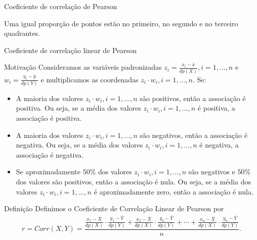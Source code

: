 \documentclass[9pt]{beamer}
\begin{document}
\begin{frame}{Coeficiente de correlação de Pearson}
\begin{center}
\begin{minipage}[b]{0.35\linewidth}
\begin{figure}[htbp]
			\end{figure}
		\end{minipage}%
		\begin{minipage}[b]{0.35\linewidth}
			\begin{center}
					Uma igual proporção de pontos estão no primeiro, no segundo e no terceiro quadrantes.
			\end{center}
		\end{minipage} 
	\end{center}
	
\normalsize
\end{frame}

\begin{frame}{Coeficiente de correlação linear de Pearson}

\small
\begin{block}{Motivação}
	Consideramos as variáveis padronizadas $z_i = \frac{x_i - \bar{x}}{dp(X)}, i=1, \dots, n$ e $w_i = \frac{y_i - \bar{y}}{dp(Y)}$ e multiplicamos as coordenadas $z_i \cdot w_i, i=1, \dots, n$. Se:
	\begin{itemize}
		\item A maioria dos valores  $z_i \cdot w_i, i=1, \dots, n$ são positivos, então a associação é positiva. Ou seja, se a média dos valores $z_i \cdot w_i, i=1, \dots, n$ é positiva, a associação é positiva.
		\item A maioria dos valores  $z_i \cdot w_i, i=1, \dots, n$ são negativos, então a associação é negativa. Ou seja, se a média dos valores $z_i \cdot w_i, i=1, \dots, n$ é negativa, a associação é negativa.
		\item Se aproximadamente $50\%$ dos valores $z_i \cdot w_i, i=1, \dots, n$ são negativos e $50\%$ dos valores são positivos, então a associação é nula. Ou seja,  se a média dos valores $z_i \cdot w_i, i=1, \dots, n$ é aproximadamente zero, então a associação é nula.
	\end{itemize}
\end{block}
\vfill

\begin{block}{Definição}
	Definimos o Coeficiente de Correlação Linear de Pearson por
	\begin{align*}
	r =	Corr(X, Y) = \dfrac{ \frac{x_1 - \bar{X}}{dp(X)} \cdot \frac{y_1 - \bar{Y}}{dp(Y)} + \frac{x_2 - \bar{X}}{dp(X)} \cdot \frac{y_2 - \bar{Y}}{dp(Y)} + \cdots + \frac{x_n - \bar{X}}{dp(X)} \cdot \frac{y_n - \bar{Y}}{dp(Y)} }{n}.
	\end{align*}
\end{block}
\normalsize

\end{frame}
\end{document}
